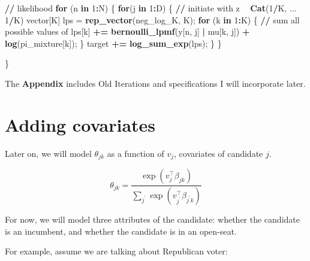 \documentclass[12pt,letterpaper]{article}
\newenvironment{Shaded}{\begin{snugshade}}{\end{snugshade}}
\newcommand{\ControlFlowTok}[1]{\textcolor[rgb]{0.13,0.29,0.53}{\textbf{#1}}}
\newcommand{\DecValTok}[1]{\textcolor[rgb]{0.00,0.00,0.81}{#1}}
\newcommand{\ErrorTok}[1]{\textcolor[rgb]{0.64,0.00,0.00}{\textbf{#1}}}
\newcommand{\KeywordTok}[1]{\textcolor[rgb]{0.13,0.29,0.53}{\textbf{#1}}}
\newcommand{\NormalTok}[1]{#1}
\newcommand{\OperatorTok}[1]{\textcolor[rgb]{0.81,0.36,0.00}{\textbf{#1}}}
\newcommand{\StringTok}[1]{\textcolor[rgb]{0.31,0.60,0.02}{#1}}
\begin{document}
\begin{Shaded}
\begin{Highlighting}[]
  \OperatorTok{/}\ErrorTok{/}\StringTok{ }\NormalTok{likelihood}
  \ControlFlowTok{for}\NormalTok{ (n }\ControlFlowTok{in} \DecValTok{1}\OperatorTok{:}\NormalTok{N) \{}
    \ControlFlowTok{for}\NormalTok{(j }\ControlFlowTok{in} \DecValTok{1}\OperatorTok{:}\NormalTok{D) \{}
      \OperatorTok{/}\ErrorTok{/}\StringTok{ }\NormalTok{initiate with z }\OperatorTok{~}\StringTok{ }\KeywordTok{Cat}\NormalTok{(}\DecValTok{1}\OperatorTok{/}\NormalTok{K, ... }\DecValTok{1}\OperatorTok{/}\NormalTok{K)}
\NormalTok{      vector[K] lps =}\StringTok{ }\KeywordTok{rep_vector}\NormalTok{(neg_log_K, K);}
      \ControlFlowTok{for}\NormalTok{ (k }\ControlFlowTok{in} \DecValTok{1}\OperatorTok{:}\NormalTok{K) \{}
        \OperatorTok{/}\ErrorTok{/}\StringTok{ }\NormalTok{sum all possible values of}
\NormalTok{        lps[k] }\OperatorTok{+}\ErrorTok{=}\StringTok{ }\KeywordTok{bernoulli_lpmf}\NormalTok{(y[n, j] }\OperatorTok{|}\StringTok{ }\NormalTok{mu[k, j]) }\OperatorTok{+}\StringTok{ }\KeywordTok{log}\NormalTok{(pi_mixture[k]);}
\NormalTok{      \}}
\NormalTok{      target }\OperatorTok{+}\ErrorTok{=}\StringTok{ }\KeywordTok{log_sum_exp}\NormalTok{(lps);}
\NormalTok{    \}}
\NormalTok{  \}}



\NormalTok{\}}
\end{Highlighting}
\end{Shaded}

\pagebreak

\appendix

The \textbf{Appendix} includes Old Iterations and specifications I will
incorporate later.

\section{Adding covariates}

Later on, we will model \(\theta_{jk}\) as a function of \(v_{j}\),
covariates of candidate \(j\).

\[\theta_{jk} = \frac{\exp(v_{j}^{\top}\beta_{jk})}{\sum_{j^{\prime}} \exp(v_{j^{\prime}}^{\top}\beta_{j^{\prime}k})} \]

For now, we will model three attributes of the candidate: whether the
candidate is an incumbent, and whether the candidate is in an open-seat.

For example, assume we are talking about Republican voter:
\end{document}
